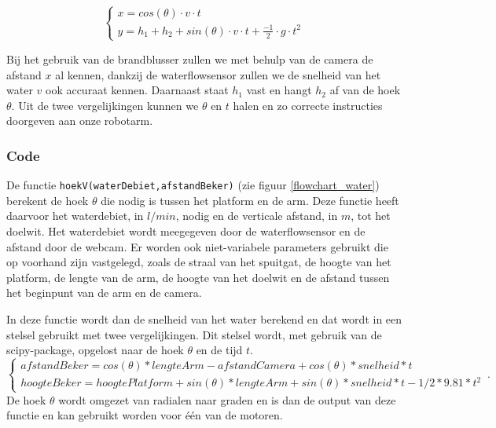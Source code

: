 \documentclass[kulak]{kulakarticle} %
\begin{document}
				\begin{equation}
					\begin{cases}
						x  = cos(\theta) \cdot v \cdot t \\
						y = h_1 + h_2 + sin(\theta) \cdot v \cdot t + \frac{-1}{2} \cdot g \cdot t^2
					\end{cases}
				\end{equation}
				
			Bij het gebruik van de brandblusser zullen we met behulp van de camera de afstand \(x\) al kennen, dankzij de waterflowsensor zullen we de snelheid van het water \(v\) ook accuraat kennen.  Daarnaast staat \(h_1\) vast en hangt \(h_2\) af van de hoek \(\theta\). Uit de twee vergelijkingen kunnen we \(\theta\) en \(t\) halen en zo correcte instructies doorgeven aan onze robotarm.

		\subsubsection{Code}
		
			De functie \verb*|hoekV(waterDebiet,afstandBeker)| (zie figuur \ref{flowchart_water}) berekent de hoek \(\theta\)  die nodig is tussen het platform en de arm. Deze functie heeft daarvoor het waterdebiet, in \(l/min\), nodig en de verticale afstand, in \(m\), tot het doelwit. Het waterdebiet wordt meegegeven door de waterflowsensor en de afstand door de webcam. Er worden ook niet-variabele parameters gebruikt die op voorhand zijn vastgelegd, zoals de straal van het spuitgat, de hoogte van het platform, de lengte van de arm, de hoogte van het doelwit en de afstand tussen het beginpunt van de arm en de camera. 

			In deze functie wordt dan de snelheid van het water berekend en dat wordt in een stelsel gebruikt met twee vergelijkingen. Dit stelsel wordt, met gebruik van de scipy-package, opgelost naar de hoek \(\theta\) en de tijd \(t\).
				\begin{equation}
					\begin{cases}
						afstandBeker  = cos(\theta )*lengteArm - afstandCamera + cos(\theta )*snelheid*t \\ 
						hoogteBeker  =  hoogtePlatform + sin(\theta )*lengteArm + sin(\theta )*snelheid*t - 1/2*9.81*t^2
					\end{cases}\,.
				\end{equation}
			De hoek \(\theta\) wordt omgezet van radialen naar graden en is dan de output van deze functie en kan gebruikt worden voor één van de motoren.
\end{document}
